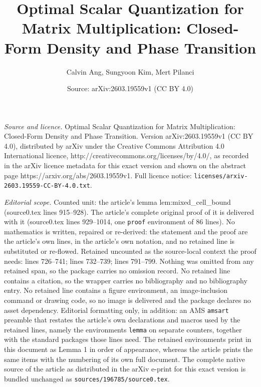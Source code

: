 \documentclass[10pt,a4paper]{amsart}
\title{Optimal Scalar Quantization for Matrix Multiplication: Closed-Form Density and Phase Transition}
\author{Calvin Ang, Sungyoon Kim, Mert Pilanci}
\date{Source: arXiv:2603.19559v1 (CC BY 4.0)}
\begin{document}
\maketitle

\noindent\emph{Source and licence.} Optimal Scalar Quantization for Matrix Multiplication: Closed-Form Density and Phase Transition. Version arXiv:2603.19559v1 (CC BY 4.0), distributed by arXiv under the Creative Commons Attribution 4.0 International licence, http://creativecommons.org/licenses/by/4.0/, as recorded in the arXiv licence metadata for this exact version and shown on the abstract page https://arxiv.org/abs/2603.19559v1. Full licence notice: \texttt{licenses/arxiv-2603.19559-CC-BY-4.0.txt}.\par\smallskip

\noindent\textit{Editorial scope.} Counted unit: the article's lemma lem:mixed\_cell\_bound (source0.tex lines 915--928). The article's complete original proof of it is delivered with it (source0.tex lines 929--1014, one \texttt{proof} environment of 86 lines). No mathematics is written, repaired or re-derived: the statement and the proof are the article's own lines, in the article's own notation, and no retained line is substituted or re-flowed.  Retained uncounted as the source-local context the proof needs: lines 726--741; lines 732--739; lines 791--799.  Nothing was omitted from any retained span, so the package carries no omission record.  No retained line contains a citation, so the wrapper carries no bibliography and no bibliography entry.  No retained line contains a figure environment, an image-inclusion command or drawing code, so no image is delivered and the package declares no asset dependency.  Editorial formatting only, in addition: an AMS \texttt{amsart} preamble that restates the article's own declarations and macros used by the retained lines, namely the environments \texttt{lemma} on separate counters, together with the standard packages those lines need.  The retained environments print in this document as Lemma 1 in order of appearance, whereas the article prints the same items with the numbering of its own full document.  The complete native source of the article as distributed in the arXiv e-print for this exact version is bundled unchanged as \texttt{sources/196785/source0.tex}.
\end{document}
